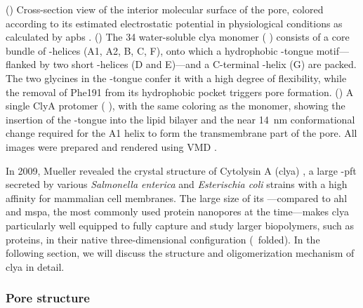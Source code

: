 \begin{figure*}[p]
{  %
  ()
  Cross-section view of the interior molecular surface of the pore, colored according to its estimated
  electrostatic potential in physiological conditions as calculated by \gls{apbs}
  \cite{Baker-2001,Baker-2005}.
  ()
  The \SI{34}{\kDa} water-soluble \gls{clya} monomer ( \cite{Wallace-2000}) consists of a core
  bundle of \ta-helices (\ta A1, \ta A2, \ta B, \ta C, \ta F), onto which a hydrophobic \tb-tongue
  motif---flanked by two short \ta-helices (\ta D and \ta E)---and a C-terminal \ta-helix (\ta G) are packed.
  The two glycines in the \tb-tongue confer it with a high degree of flexibility, while the removal of Phe191
  from its hydrophobic pocket triggers pore formation.
  ()
  A single ClyA protomer ( \cite{Peng-2019}), with the same coloring as the monomer, showing the
  insertion of the \ta-tongue into the lipid bilayer and the near \SI{14}{\nm} conformational change required
  for the \ta A1 helix to form the transmembrane part of the pore.
  All images were prepared and rendered using VMD \cite{Humphrey-1996,Stone-1998}.
  }\label{fig:clya_pore_structure}
\end{figure*}

In 2009, Mueller \etal{} revealed the crystal structure of Cytolysin A (\gls{clya}) \cite{Mueller-2009}, a
large \textalpha-\gls{pft} secreted by various \textit{Salmonella enterica} and \textit{Esterischia coli}
strains with a high affinity for mammalian cell membranes. The large size of its \lumen---compared to
\gls{ahl} and \gls{mspa}, the most commonly used protein nanopores at the time---makes \gls{clya} particularly
well equipped to fully capture and study larger biopolymers, such as proteins, in their native
three-dimensional configuration (\ie~folded). In the following section, we will discuss the structure and
oligomerization mechanism of \gls{clya} in detail.

\subsubsection{Pore structure}

